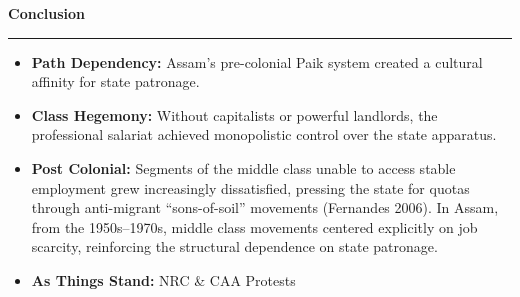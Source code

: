 \documentclass[aspectratio=169, 10pt]{beamer}
\newcommand{\slidetitle}[1]{%
  \vspace{-4pt}%
  {\usebeamerfont{frametitle}\Large\color{ink}\textbf{#1}}%
  \par\vspace{2pt}%
  {\color{clay}\rule{40pt}{2pt}}%
  \par\vspace{8pt}%
}
\begin{document}
\begin{frame}
\slidetitle{Conclusion}

\vspace{10pt}
\begin{itemize}
  \item[\textcolor{rust}{\textbf{1.}}] \textbf{Path Dependency:} Assam's pre-colonial Paik system created a cultural affinity for state patronage.
  
  \vspace{8pt}
  \item[\textcolor{rust}{\textbf{2.}}] \textbf{Class Hegemony:} Without capitalists or powerful landlords, the professional salariat achieved monopolistic control over the state apparatus.
  
  \vspace{8pt}
  \item[\textcolor{rust}{\textbf{3.}}] \textbf{Post Colonial:} Segments of the middle class unable to access stable employment grew increasingly dissatisfied, pressing the state for quotas through anti-migrant ``sons-of-soil'' movements (Fernandes 2006). In Assam, from the 1950s--1970s, middle class movements centered explicitly on job scarcity, reinforcing the structural dependence on state patronage. 
  \vspace{8pt}
  \item[\textcolor{rust}{\textbf{3.}}] \textbf{As Things Stand:} NRC \& CAA Protests 
\end{itemize}
\end{frame}

\end{document}
